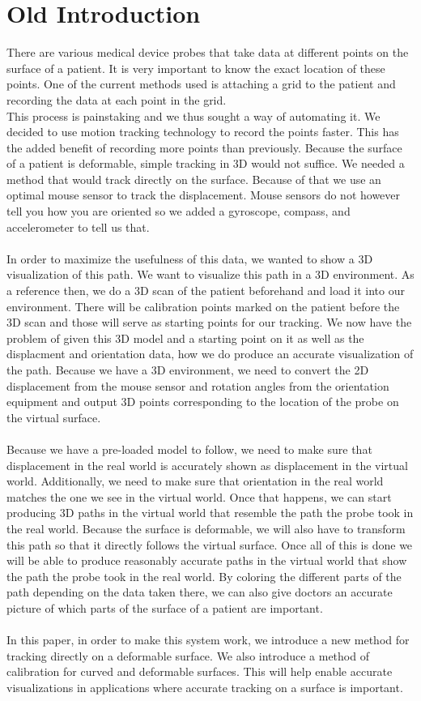 \section{Old Introduction}

There are various medical device probes that take data at different points on the surface of a patient. It is very important to know the exact location of these points. One of the current methods used is attaching a grid to the patient and recording the data at each point in the grid. 
\\
This process is painstaking and we thus sought a way of automating it. We decided to use motion tracking technology to record the points faster. This has the added benefit of recording more points than previously. Because the surface of a patient is deformable, simple tracking in 3D would not suffice. We needed a method that would track directly on the surface. Because of that we use an optimal mouse sensor to track the displacement. Mouse sensors do not however tell you how you are oriented so we added a gyroscope, compass, and accelerometer to tell us that. \\
\\
In order to maximize the usefulness of this data, we wanted to show a 3D visualization of this path. We want to visualize this path in a 3D environment. As a reference then, we do a 3D scan of the patient beforehand and load it into our environment. There will be calibration points marked on the patient before the 3D scan and those will serve as starting points for our tracking. We now have the problem of given this 3D model and a starting point on it as well as the displacment and orientation data, how we do produce an accurate visualization of the path. Because we have a 3D environment, we need to convert the 2D displacement from the mouse sensor and rotation angles from the orientation equipment and output 3D points corresponding to the location of the probe on the virtual surface. \\
\\
Because we have a pre-loaded model to follow, we need to make sure that displacement in the real world is accurately shown as displacement in the virtual world. Additionally, we need to make sure that orientation in the real world matches the one we see in the virtual world. Once that happens, we can start producing 3D paths in the virtual world that resemble the path the probe took in the real world. Because the surface is deformable, we will also have to transform this path so that it directly follows the virtual surface. Once all of this is done we will be able to produce reasonably accurate paths in the virtual world that show the path the probe took in the real world. By coloring the different parts of the path depending on the data taken there, we can also give doctors an accurate picture of which parts of the surface of a patient are important.\\
\\
In this paper, in order to make this system work, we introduce a new method for tracking directly on a deformable surface. We also introduce a method of calibration for curved and deformable surfaces. This will help enable accurate visualizations in applications where accurate tracking on a surface is important.